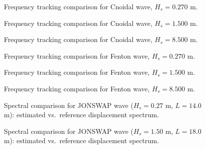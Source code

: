 \documentclass[11pt,letterpaper]{article}
\begin{document}
\begin{figure}[H]\centering
  \resizebox{\textwidth}{!}{}
  \caption{Frequency tracking comparison for Cnoidal wave, $H_s = 0.270$ m.}
  \label{fig:freqtrack_cnoidal_low}
\end{figure}

\begin{figure}[H]\centering
  \resizebox{\textwidth}{!}{}
  \caption{Frequency tracking comparison for Cnoidal wave, $H_s = 1.500$ m.}
  \label{fig:freqtrack_cnoidal_medium}
\end{figure}

\begin{figure}[H]\centering
  \resizebox{\textwidth}{!}{}
  \caption{Frequency tracking comparison for Cnoidal wave, $H_s = 8.500$ m.}
  \label{fig:freqtrack_cnoidal_high}
\end{figure}

\begin{figure}[H]\centering
  \resizebox{\textwidth}{!}{}
  \caption{Frequency tracking comparison for Fenton wave, $H_s = 0.270$ m.}
  \label{fig:freqtrack_fenton_low}
\end{figure}

\begin{figure}[H]\centering
  \resizebox{\textwidth}{!}{}
  \caption{Frequency tracking comparison for Fenton wave, $H_s = 1.500$ m.}
  \label{fig:freqtrack_fenton_medium}
\end{figure}

\begin{figure}[H]\centering
  \resizebox{\textwidth}{!}{}
  \caption{Frequency tracking comparison for Fenton wave, $H_s = 8.500$ m.}
  \label{fig:freqtrack_fenton_high}
\end{figure}


\begin{figure}[H]\centering
  \resizebox{\textwidth}{!}{}
  \caption{Spectral comparison for JONSWAP wave ($H_s = 0.27$ m, $L = 14.0$ m):
  estimated vs.\ reference displacement spectrum.}
  \label{fig:regspec_jonswap_low}
\end{figure}

\begin{figure}[H]\centering
  \resizebox{\textwidth}{!}{}
  \caption{Spectral comparison for JONSWAP wave ($H_s = 1.50$ m, $L = 18.0$ m):
  estimated vs.\ reference displacement spectrum.}
  \label{fig:regspec_jonswap_medium}
\end{figure}
\end{document}
